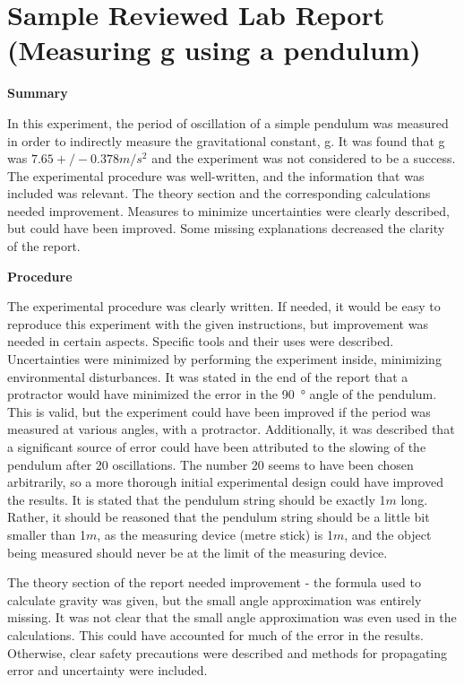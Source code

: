  \vspace{0.25cm}
\section{Sample Reviewed Lab Report (Measuring g using a pendulum)}
 \vspace{0.25cm}
\textbf{Summary}

In this experiment, the period of oscillation of a simple pendulum was measured in order to indirectly measure the gravitational constant, g. It was found that g was $\SI{7.65}+/- {0.378}{m/s^2}$ and the experiment was not considered to be a success. The experimental procedure was well-written, and the information that was included was relevant. The theory section and the corresponding calculations needed improvement. Measures to minimize uncertainties were clearly described, but could have been improved. Some missing explanations decreased the clarity of the report.

\textbf{Procedure}

The experimental procedure was clearly written. If needed, it would be easy to reproduce this experiment with the given instructions, but improvement was needed in certain aspects. Specific tools and their uses were described. Uncertainties were minimized by performing the experiment inside, minimizing environmental disturbances. It was stated in the end of the report that a protractor would have minimized the error in the \SI{90}{\degree} angle of the pendulum. This is valid, but the experiment could have been improved if the period was measured at various angles, with a protractor. Additionally, it was described that a significant source of error could have been attributed to the slowing of the pendulum after 20 oscillations. The number 20 seems to have been chosen arbitrarily, so a more thorough initial experimental design could have improved the results. It is stated that the pendulum string should be exactly 1$\si{m}$ long. Rather,  it should be reasoned that the pendulum string should be a little bit smaller than 1$\si{m}$, as the measuring device (metre stick) is 1$\si{m}$, and the object being measured should never be at the limit of the measuring device. 

The theory section of the report needed improvement - the formula used to calculate gravity was given, but the small angle approximation was entirely missing. It was not clear that the small angle approximation was even used in the calculations. This could have accounted for much of the error in the results. Otherwise, clear safety precautions were described and methods for propagating error and uncertainty were included.


